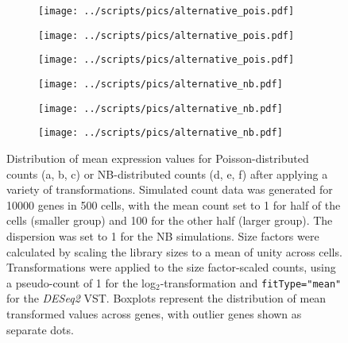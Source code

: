 \documentclass[10pt,letterpaper]{article}
\newcommand\code[1]{{\small\texttt{#1}}}
\begin{document}
\begin{figure}
\centering
\begin{subfigure}[b]{0.32\textwidth}
    \texttt{[image: ../scripts/pics/alternative\_pois.pdf]}
    \caption{}
\end{subfigure}
\begin{subfigure}[b]{0.32\textwidth}
    \texttt{[image: ../scripts/pics/alternative\_pois.pdf]}
    \caption{}
\end{subfigure}
\begin{subfigure}[b]{0.32\textwidth}
    \texttt{[image: ../scripts/pics/alternative\_pois.pdf]}
    \caption{}
\end{subfigure}
\begin{subfigure}[b]{0.32\textwidth}
    \texttt{[image: ../scripts/pics/alternative\_nb.pdf]}
    \caption{}
\end{subfigure}
\begin{subfigure}[b]{0.32\textwidth}
    \texttt{[image: ../scripts/pics/alternative\_nb.pdf]}
    \caption{}
\end{subfigure}
\begin{subfigure}[b]{0.32\textwidth}
    \texttt{[image: ../scripts/pics/alternative\_nb.pdf]}
    \caption{}
\end{subfigure}
\caption{Distribution of mean expression values for Poisson-distributed counts (a, b, c) or NB-distributed counts (d, e, f) after applying a variety of transformations.
Simulated count data was generated for 10000 genes in 500 cells, with the mean count set to 1 for half of the cells (smaller group) and 100 for the other half (larger group).
The dispersion was set to 1 for the NB simulations.
Size factors were calculated by scaling the library sizes to a mean of unity across cells.
Transformations were applied to the size factor-scaled counts, using a pseudo-count of 1 for the log$_2$-transformation and \code{fitType="mean"} for the \textit{DESeq2} VST.
Boxplots represent the distribution of mean transformed values across genes, with outlier genes shown as separate dots.
}
\label{fig:alttransform}
\end{figure}
\end{document}
